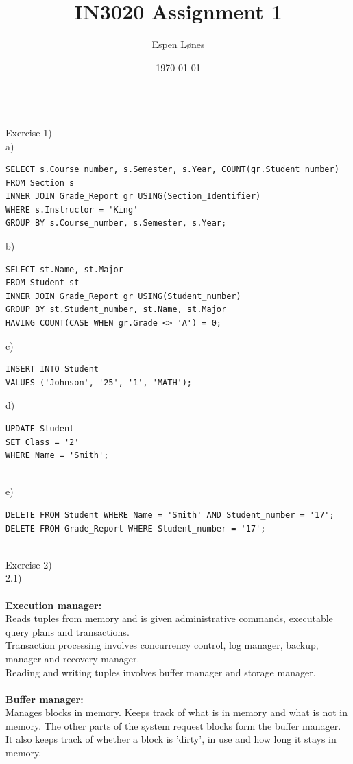 \documentclass[12pt, letterpaper, twoside]{article}
\begin{document}
\title{IN3020 Assignment 1}
\author{Espen Lønes}
\date{\today}
\maketitle
\ \\
Exercise 1)\\
a)
\begin{verbatim}
SELECT s.Course_number, s.Semester, s.Year, COUNT(gr.Student_number)
FROM Section s
INNER JOIN Grade_Report gr USING(Section_Identifier)
WHERE s.Instructor = 'King'
GROUP BY s.Course_number, s.Semester, s.Year;
\end{verbatim}
b)
\begin{verbatim}
SELECT st.Name, st.Major
FROM Student st
INNER JOIN Grade_Report gr USING(Student_number)
GROUP BY st.Student_number, st.Name, st.Major
HAVING COUNT(CASE WHEN gr.Grade <> 'A') = 0;
\end{verbatim}
c)
\begin{verbatim}
INSERT INTO Student
VALUES ('Johnson', '25', '1', 'MATH');
\end{verbatim}
d)
\begin{verbatim}
UPDATE Student
SET Class = '2'
WHERE Name = 'Smith';
\end{verbatim}
\newpage
\ \\
e)
\begin{verbatim}
DELETE FROM Student WHERE Name = 'Smith' AND Student_number = '17';
DELETE FROM Grade_Report WHERE Student_number = '17';
\end{verbatim}
\ \\
Exercise 2)\\
2.1)\\
\ \\
\textbf{Execution manager:}\\
Reads tuples from memory and is given administrative commands, executable query plans and transactions.\\
Transaction processing involves concurrency control, log manager, backup, manager and recovery manager.\\
Reading and writing tuples involves buffer manager and storage manager.\\ 
\\
\textbf{Buffer manager:}\\
Manages blocks in memory. Keeps track of what is in memory and what is not in memory. The other parts of the system request blocks form the buffer manager.
It also keeps track of whether a block is 'dirty', in use and how long it stays in memory.\\
\end{document}
